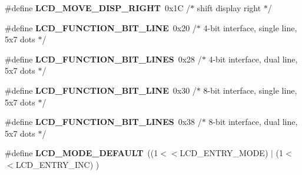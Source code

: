 \begin{DoxyCompactItemize}
\item 
\#define {\bfseries L\+C\+D\+\_\+\+M\+O\+V\+E\+\_\+\+D\+I\+S\+P\+\_\+\+R\+I\+G\+HT}~0x1\+C   /$\ast$ shift display right                    $\ast$/\hypertarget{group__pfleury__lcd_ga9a90bb926f5ba59378af81fe8e246ffb}{}\label{group__pfleury__lcd_ga9a90bb926f5ba59378af81fe8e246ffb}

\item 
\#define {\bfseries L\+C\+D\+\_\+\+F\+U\+N\+C\+T\+I\+O\+N\+\_\+B\+I\+T\+\_\+L\+I\+NE}~0x20   /$\ast$ 4-\/bit interface, single line, 5x7 dots $\ast$/\hypertarget{group__pfleury__lcd_gaff4e5baa36a0322eb97557dcb18cd96e}{}\label{group__pfleury__lcd_gaff4e5baa36a0322eb97557dcb18cd96e}

\item 
\#define {\bfseries L\+C\+D\+\_\+\+F\+U\+N\+C\+T\+I\+O\+N\+\_\+B\+I\+T\+\_\+L\+I\+N\+ES}~0x28   /$\ast$ 4-\/bit interface, dual line,   5x7 dots $\ast$/\hypertarget{group__pfleury__lcd_gab35032ab368a8bc90798e0c547fb24c2}{}\label{group__pfleury__lcd_gab35032ab368a8bc90798e0c547fb24c2}

\item 
\#define {\bfseries L\+C\+D\+\_\+\+F\+U\+N\+C\+T\+I\+O\+N\+\_\+B\+I\+T\+\_\+L\+I\+NE}~0x30   /$\ast$ 8-\/bit interface, single line, 5x7 dots $\ast$/\hypertarget{group__pfleury__lcd_gaa8aeee098cb4c84ec420e00d054abcce}{}\label{group__pfleury__lcd_gaa8aeee098cb4c84ec420e00d054abcce}

\item 
\#define {\bfseries L\+C\+D\+\_\+\+F\+U\+N\+C\+T\+I\+O\+N\+\_\+B\+I\+T\+\_\+L\+I\+N\+ES}~0x38   /$\ast$ 8-\/bit interface, dual line,   5x7 dots $\ast$/\hypertarget{group__pfleury__lcd_ga160a214f47869f8f98ad5add3a7568db}{}\label{group__pfleury__lcd_ga160a214f47869f8f98ad5add3a7568db}

\item 
\#define {\bfseries L\+C\+D\+\_\+\+M\+O\+D\+E\+\_\+\+D\+E\+F\+A\+U\+LT}~((1$<$$<$L\+C\+D\+\_\+\+E\+N\+T\+R\+Y\+\_\+\+M\+O\+DE) $\vert$ (1$<$$<$L\+C\+D\+\_\+\+E\+N\+T\+R\+Y\+\_\+\+I\+NC) )\hypertarget{group__pfleury__lcd_ga1849e2087d3034a3fffa67444beed109}{}\label{group__pfleury__lcd_ga1849e2087d3034a3fffa67444beed109}

\end{DoxyCompactItemize}
